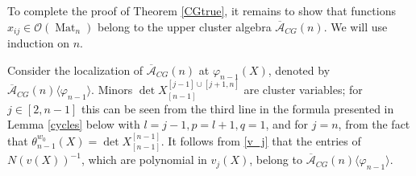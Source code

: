 \documentclass{amsart}
\theoremstyle{definition}
\theoremstyle{remark}
\numberwithin{equation}{section}
\numberwithin{theorem}{section}
\begin{document}
 To complete the proof of Theorem \ref{CGtrue}, it remains to show that functions $x_{ij} \in {{\mathcal O}} ({\operatorname{Mat}}_n)$ belong to the upper cluster algebra ${\overline{{\mathcal A}}}_{CG}(n)$. We will use induction on $n$.

Consider  the localization of ${\overline{{\mathcal A}}}_{CG}(n)$ at ${{\varphi}}_{n-1}(X)$, denoted by
${\overline{{\mathcal A}}}_{CG}(n)\langle {{\varphi}}_{n-1}\rangle $.
Minors $\det X_{[n-1]}^{[j-1]\cup[j+1,n]}$ are cluster variables; for $j\in [2, n-1]$ this
can be seen from the third line in the formula presented in Lemma \ref{cycles} below with
$l=j-1, p= l+1, q =1$, and for $j=n$, from the fact that $\theta_{n-1}^{w_0}(X)=\det X_{[n-1]}^{[ n-1]}$. It follows from  \eqref{v_j} that
the entries of $N(v(X))^{-1}$, which are polynomial in $v_j(X)$, belong to 
${\overline{{\mathcal A}}}_{CG}(n)\langle {{\varphi}}_{n-1}\rangle $. 
\end{document}

